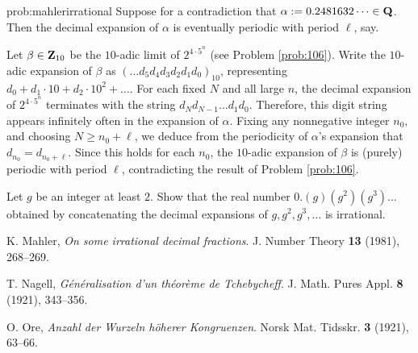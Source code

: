 
\begin{sol}{prob:mahlerirrational}  Suppose for a contradiction that $\alpha:= 0.2481632\dots \in \mathbf{Q}$. Then the decimal expansion of $\alpha$ is eventually periodic with period $\ell$, say.

Let $\beta \in  \mathbf{Z}_{10}$ be the $10$-adic limit of $2^{4\cdot 5^n}$ (see Problem \ref{prob:106}). Write the $10$-adic expansion of $\beta$ as $(\dots d_5 d_4 d_3 d_2 d_1 d_0)_{10}$, representing $d_0 + d_1\cdot 10 + d_2\cdot 10^2 + \dots$. For each fixed $N$ and all large $n$, the decimal expansion of $2^{4\cdot 5^n}$ terminates with the string $d_N d_{N-1} \dots d_1 d_0$. Therefore, this digit string appears infinitely often in the expansion of $\alpha$. Fixing any nonnegative integer $n_0$, and choosing $N \ge n_0+\ell$, we deduce from the periodicity of $\alpha$'s expansion that $d_{n_0} = d_{n_0+\ell}$. Since this holds for each $n_0$, the $10$-adic expansion of $\beta$ is (purely) periodic with period $\ell$, contradicting the result of Problem \ref{prob:106}.
\end{sol}

\begin{challenge} Let $g$ be an integer at least $2$. Show that the real number $0.(g)(g^2)(g^3)\dots$ obtained by concatenating the decimal expansions of $g, g^2, g^3,\dots$ is irrational.
\end{challenge}




\renewcommand\refname{\normalsize References}
\let\oldaddcontentsline\addcontentsline
\renewcommand{\addcontentsline}[3]{}
\begin{thebibliography}{11}

K. Mahler, \emph{On some irrational decimal fractions}. J. Number Theory \textbf{13} (1981), 268--269.

T. Nagell, \emph{Généralisation d'un théorème de Tchebycheff}. J. Math. Pures Appl. \textbf{8} (1921), 343--356.

 O. Ore, \emph{Anzahl der Wurzeln h\"{o}herer Kongruenzen}.
Norsk Mat. Tidsskr. \textbf{3} (1921), 63--66.
\end{thebibliography}
\let\addcontentsline\oldaddcontentsline
